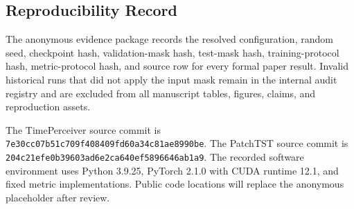 \subsection{Reproducibility Record}
\label{app:reproducibility}

The anonymous evidence package records the resolved configuration, random seed, checkpoint hash, validation-mask hash, test-mask hash, training-protocol hash, metric-protocol hash, and source row for every formal paper result. Invalid historical runs that did not apply the input mask remain in the internal audit registry and are excluded from all manuscript tables, figures, claims, and reproduction assets.

The TimePerceiver source commit is \texttt{7e30cc07b51c709f408409fd60a34c81ae8990be}. The PatchTST source commit is \texttt{204c21efe0b39603ad6e2ca640ef5896646ab1a9}. The recorded software environment uses Python 3.9.25, PyTorch 2.1.0 with CUDA runtime 12.1, and fixed metric implementations. Public code locations will replace the anonymous placeholder after review.

